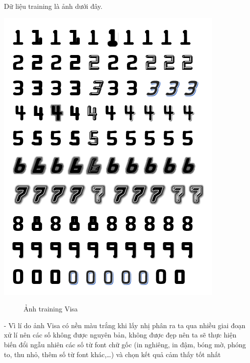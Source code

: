     \quad Dữ liệu training là ảnh dưới đây.
\begin{center}
    \includegraphics[scale = 1.2]{images/visa/training.png}
\end{center}
\begin{figure}[htp]
    \caption{Ảnh training Visa}
\end{figure}

-	Vì lí do ảnh Visa có nền màu trắng khi lấy nhị phân ra ta qua nhiều giai đoạn xử lí nên các số không được nguyên bản, không được đẹp nên ta sẽ thực hiện biến đổi ngẫu nhiên các số từ font chữ gốc (in nghiêng, in đậm, bóng mờ, phóng to, thu nhỏ, thêm số từ font khác,…) và chọn kết quả cảm thấy tốt nhất

